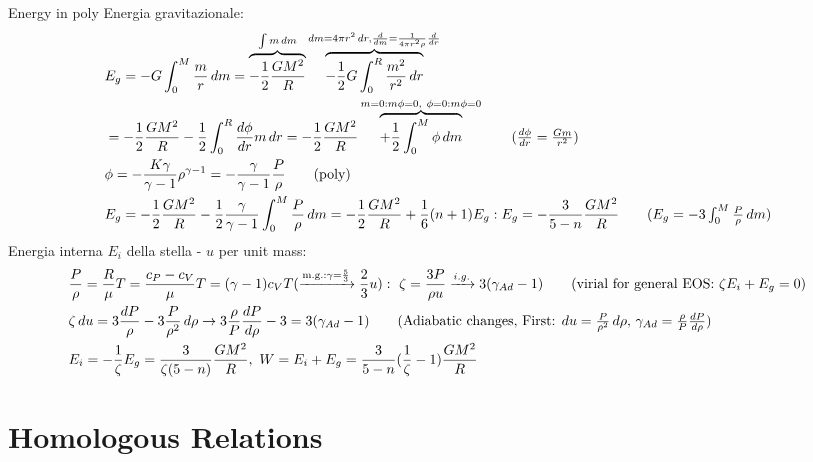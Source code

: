 \begin{frame}{Energy in poly}
Energia gravitazionale:
\begin{align*}
&E_g=-G\int_0^M\frac{m}{r}\,dm=\overbrace{-\frac{1}{2}\frac{GM^2}{R}}^{\int m\,dm}\overbrace{-\frac{1}{2}G\int_0^R \frac{m^2}{r^2}\,dr}^{dm=4\pi r^2\,dr, \TDof{m}=\frac{1}{4\pi r^2\rho}\TDof{r}}\\
&=-\frac{1}{2}\frac{GM^2}{R}-\frac{1}{2}\int_0^R\TDy{r}{\phi}m\,dr=-\frac{1}{2}\frac{GM^2}{R}\overbrace{+\frac{1}{2}\int_0^M\phi\,dm}^{m=0: m\phi=0,\ \phi=0: m\phi=0}\tag{$\TDy{r}{\phi}=\frac{Gm}{r^2}$}\\
&\phi=-\frac{K\gamma}{\gamma-1}\rho^{\gamma-1}=-\frac{\gamma}{\gamma-1}\frac{P}{\rho}\tag{poly}\\
&E_g=-\frac{1}{2}\frac{GM^2}{R}-\frac{1}{2}\frac{\gamma}{\gamma-1}\int_0^M \frac{P}{\rho}\,dm=-\frac{1}{2}\frac{GM^2}{R}+\frac{1}{6}(n+1)E_g: E_g=-\frac{3}{5-n}\frac{GM^2}{R}\tag{$E_g=-3\int_0^M\frac{P}{\rho}\, dm$}
\end{align*}
Energia interna $E_i$ della stella - $u$ per unit mass:
\begin{align*}
&\frac{P}{\rho}=\frac{R}{\mu}T=\frac{c_P-c_V}{\mu}T=(\gamma-1)c_VT(\xrightarrow{\text{m.g.:}\gamma=\frac{5}{3}}\frac{2}{3}u):\ \zeta=\frac{3P}{\rho u}\xrightarrow{i.g.}3(\gamma_{Ad}-1)\tag{virial for general EOS: $\zeta E_i+E_g=0$}\\
&\zeta\,du=3\frac{dP}{\rho}-3\frac{P}{\rho^2}\,d\rho\to 3\frac{\rho}{P}\TDy{\rho}{P}-3=3(\gamma_{Ad}-1)\tag{Adiabatic changes, First: $du=\frac{P}{\rho^2}\,d\rho$, $\gamma_{Ad}=\frac{\rho}{P}\TDy{\rho}{P}$}\\
&E_i=-\frac{1}{\zeta}E_g=\frac{3}{\zeta(5-n)}\frac{GM^2}{R},\ W=E_i+E_g=\frac{3}{5-n}(\frac{1}{\zeta}-1)\frac{GM^2}{R}
\end{align*}
\end{frame}

\section{Homologous Relations}

